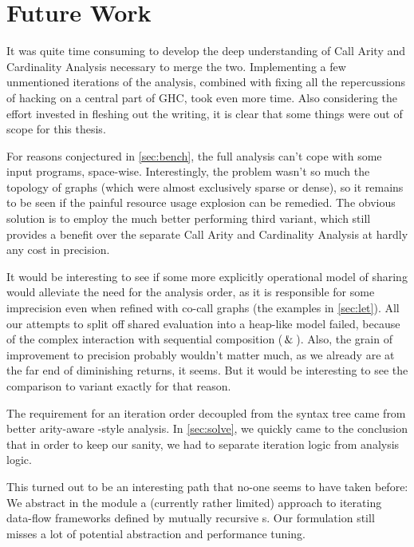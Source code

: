 \section{Future Work}\label{sec:fut}

It was quite time consuming to develop the deep understanding of Call Arity and Cardinality Analysis necessary to merge the two.
Implementing a few unmentioned iterations of the analysis, combined with fixing all the repercussions of hacking on a central part of GHC, took even more time.
Also considering the effort invested in fleshing out the writing, it is clear that some things were out of scope for this thesis.

For reasons conjectured in \cref{sec:bench}, the full analysis can't cope with some input programs, space-wise.
Interestingly, the problem wasn't so much the topology of graphs (which were almost exclusively sparse or dense), so it remains to be seen if the painful resource usage explosion can be remedied.
The obvious solution is to employ the much better performing third variant, which still provides a benefit over the separate Call Arity and Cardinality Analysis at hardly any cost in precision.

It would be interesting to see if some more explicitly operational model of sharing would alleviate the need for the  analysis order, as it is responsible for some imprecision even when refined with co-call graphs (\cf the examples in \cref{sec:let}).
All our attempts to split off shared evaluation into a heap-like model failed, because of the complex interaction with sequential composition (\eg $\,\&\,$).
Also, the grain of improvement to precision probably wouldn't matter much, as we already are at the far end of diminishing returns, it seems.
But it would be interesting to see the comparison to variant \varedges exactly for that reason.

The requirement for an iteration order decoupled from the syntax tree came from better arity-aware -style analysis.
In \cref{sec:solve}, we quickly came to the conclusion that in order to keep our sanity, we had to separate iteration logic from analysis logic.

This turned out to be an interesting path that no-one seems to have taken before:
We abstract in the  module a (currently rather limited) approach to iterating data-flow frameworks defined by mutually recursive s.
Our formulation still misses a lot of potential abstraction and performance tuning.

